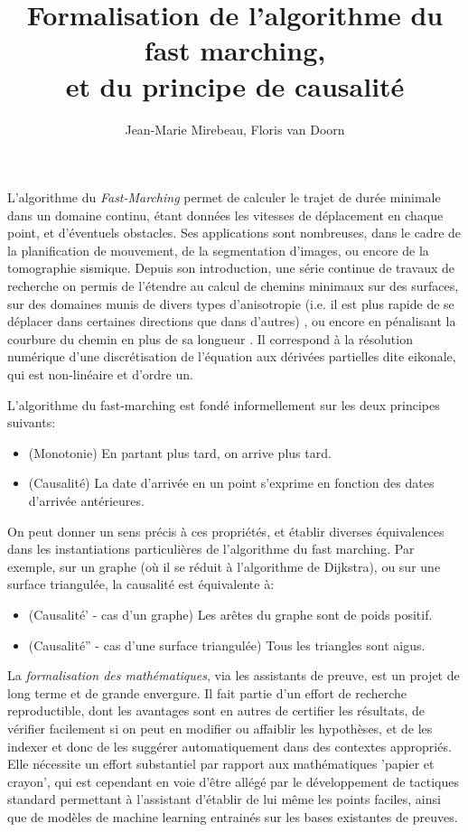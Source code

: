 \documentclass[11pt]{article}
\title{Formalisation de l'algorithme du fast marching,\\ et du principe de causalité}
\author{Jean-Marie Mirebeau, Floris van Doorn}
\begin{document}
\maketitle

L'algorithme du \emph{Fast-Marching} \cite{sethian1996fast,Tsitsiklis:1995EfficientTrajectories}
 permet de calculer le trajet de durée minimale dans un domaine continu, étant données les vitesses de déplacement en chaque point, et d'éventuels obstacles. Ses applications sont nombreuses, dans le cadre de la planification de mouvement, de la segmentation d'images, ou encore de la tomographie sismique. Depuis son introduction, une série continue de travaux de recherche on permis de l'étendre au calcul de chemins minimaux sur des surfaces, sur des domaines munis de divers types d'anisotropie (i.e. il est plus rapide de se déplacer dans certaines directions que dans d'autres) \cite{Sethian2003OUM,mirebeau2019riemannian}, ou encore en pénalisant la courbure du chemin en plus de sa longueur \cite{mirebeau2018fast}. Il correspond à la résolution numérique d'une discrétisation de l'équation aux dérivées partielles dite eikonale, qui est non-linéaire et d'ordre un. 
 
L'algorithme du fast-marching est fondé informellement sur les deux principes suivants:
\begin{itemize}
	\item (Monotonie) En partant plus tard, on arrive plus tard. 
	\item (Causalité) La date d'arrivée en un point s'exprime en fonction des dates d'arrivée antérieures. 
\end{itemize}
On peut donner un sens précis à ces propriétés, et établir diverses équivalences dans les instantiations particulières de l'algorithme du fast marching. Par exemple, sur un graphe (où il se réduit à l'algorithme de Dijkstra), ou sur une surface triangulée, la causalité est équivalente à:
\begin{itemize}
	\item (Causalité' - cas d'un graphe) Les arêtes du graphe sont de poids positif.
	\item (Causalité'' - cas d'une surface triangulée) Tous les triangles sont aigus. 
\end{itemize}

La \emph{formalisation des mathématiques}, via les assistants de preuve, est un projet de long terme et de grande envergure. Il fait partie d'un effort de recherche reproductible, dont les avantages sont en autres de certifier les résultats, de vérifier facilement si on peut en modifier ou affaiblir les hypothèses, et de les indexer et donc de les suggérer automatiquement dans des contextes appropriés. Elle nécessite un effort substantiel par rapport aux mathématiques 'papier et crayon', qui est cependant en voie d'être allégé par le développement de tactiques standard permettant à l'assistant d'établir de lui même les points faciles, ainsi que de modèles de machine learning entrainés sur les bases existantes de preuves. 
\end{document}
